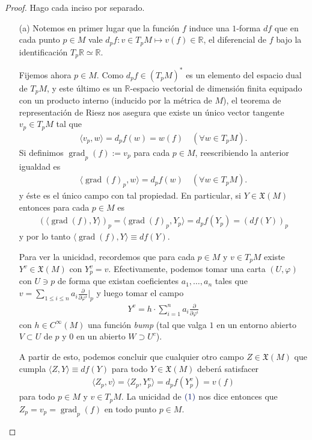 \documentclass[11pt]{article}
\newcommand{\R}{\mathbb{R}}
\newcommand{\X}{\mathfrak{X}}
\newcommand{\grad}{\operatorname{grad}}
\newcommand{\ip}[1]{\langle #1 \rangle}
\newcommand{\gancho}[1]{\frac{\partial}{\partial \varphi^{#1}}}
\newcommand{\paint}[1]{\color{color}{#1}}
\begin{document}
\begin{proof} Hago cada inciso por separado.
\begin{itemize}[listparindent = \parindent]
\item[(a)] Notemos en primer lugar que la función $f$ induce una $1$-forma $df$ que en cada punto $p \in M$ vale $d_pf : v \in T_pM \mapsto v(f) \in \R$, el diferencial de $f$ bajo la identificación $T_p\R \simeq \R$. 

Fijemos ahora $p \in M$. Como $d_pf \in (T_pM)^*$ es un elemento del espacio dual de $T_pM$, y este último es un $\R$-espacio vectorial de dimensión finita equipado con un producto interno (inducido por la métrica de $M$), el teorema de representación de Riesz nos asegura que existe un único vector tangente $v_p \in T_pM$ tal que 
\begin{align}
\ip{v_p,w} = d_pf(w) = w(f) \quad (\forall w \in T_pM).
\end{align}
Si definimos $\grad_p(f) := v_p$ para cada $p \in M$, reescribiendo la anterior igualdad es
\begin{align*}
\ip{\grad(f)_p,w} = d_pf(w) \quad (\forall w \in T_pM).
\end{align*}
y éste es el único campo con tal propiedad. En particular, si $Y \in \X(M)$ entonces para cada $p \in M$ es
\begin{align*}
(\ip{\grad(f),Y})_p = \ip{\grad(f)_p,Y_p} = d_pf(Y_p) = (df(Y))_p
\end{align*}
y por lo tanto $\ip{\grad(f),Y} \equiv df(Y)$. 

Para ver la unicidad, recordemos que para cada $p \in M$ y $v \in  T_pM$ existe $Y^v \in \X(M)$ con $Y^v_p = v$. Efectivamente, podemos tomar una carta $(U, \varphi)$ con $U \ni p$ de forma que existan coeficientes $a_1, \dots, a_n$ tales que $v = \sum_{1 \leq i \leq n}a_i \gancho{i}|_p$ y luego tomar el campo
\begin{align*}
Y^v = h \cdot \sum_{i = 1}^na_i \gancho{i}
\end{align*}
con $h \in C^\infty(M)$ una función \textit{bump} (tal que valga $1$ en un entorno abierto $V \subset U$  de $p$ y $0$ en un abierto $W \supset U^c$). 

A partir de esto, podemos concluir que cualquier otro campo $Z \in \X(M)$ que cumpla $\ip{Z,Y} \equiv df(Y)$ para todo $Y \in \X(M)$ deberá satisfacer
\begin{align*}
\ip{Z_p,v} = \ip{Z_p,Y^v_p} = d_pf(Y_p^v) = v(f)
\end{align*}
para todo $p \in M$ y $v \in T_pM$. La unicidad de $\paint{(1)}$ nos dice entonces que $Z_p = v_p = \grad_p(f)$ en todo punto $p \in M$.


\end{itemize}
\end{proof}
\end{document}
